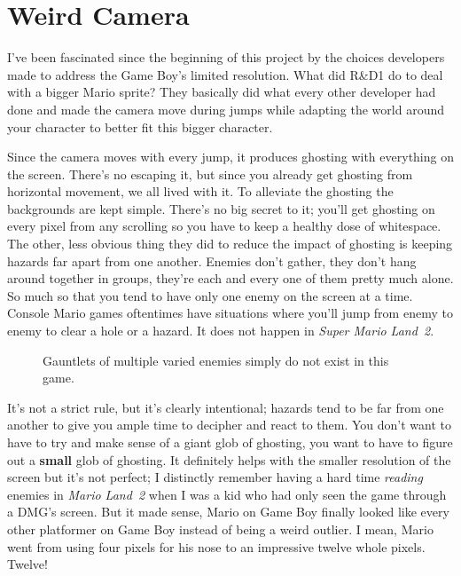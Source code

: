\documentclass{book}
\begin{document}
\FloatBarrier\section*{Weird Camera}
I’ve been fascinated since the beginning of this project by the choices developers made to address the Game Boy’s limited resolution. What did R\&D1 do to deal with a bigger Mario sprite? They basically did what every other developer had done and made the camera move during jumps while adapting the world around your character to better fit this bigger character.\par
Since the camera moves with every jump, it produces ghosting with everything on the screen. There’s no escaping it, but since you already get ghosting from horizontal movement, we all lived with it. To alleviate the ghosting the backgrounds are kept simple. There’s no big secret to it; you’ll get ghosting on every pixel from any scrolling so you have to keep a healthy dose of whitespace. The other, less obvious thing they did to reduce the impact of ghosting is keeping hazards far apart from one another. Enemies don’t gather, they don’t hang around together in groups, they’re each and every one of them pretty much alone. So much so that you tend to have only one enemy on the screen at a time. Console Mario games oftentimes have situations where you’ll jump from enemy to enemy to clear a hole or a hazard. It does not happen in \emph{Super Mario Land~2}.\par
\FloatBarrier\vspace{\baselineskip}\begin{figure}[H]\caption*{Gauntlets of multiple varied enemies simply do not exist in this game.}\end{figure}
It’s not a strict rule, but it’s clearly intentional; hazards tend to be far from one another to give you ample time to decipher and react to them. You don’t want to have to try and make sense of a giant glob of ghosting, you want to have to figure out a \textbf{small} glob of ghosting. It definitely helps with the smaller resolution of the screen but it’s not perfect; I distinctly remember having a hard time \emph{reading} enemies in \emph{Mario Land~2} when I was a kid who had only seen the game through a DMG’s screen. But it made sense, Mario on Game Boy finally looked like every other platformer on Game Boy instead of being a weird outlier. I mean, Mario went from using four pixels for his nose to an impressive twelve whole pixels. Twelve!\par
\end{document}
